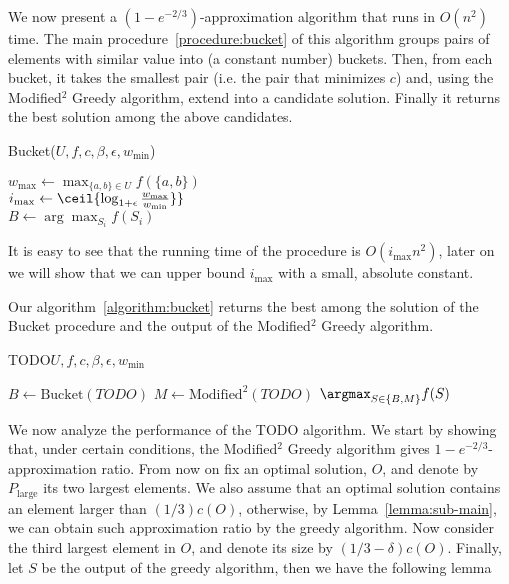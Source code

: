 \def\pLarge{P_{\text{large}}}
\def\pValuable{P_{\text{valuable}}}

We now present a $(1-e^{-2/3})$-approximation algorithm that runs in $O(n^2)$ time.
The main procedure~\ref{procedure:bucket} of this algorithm  groups pairs of elements with similar value into (a constant number) buckets.
Then, from each bucket, it takes the smallest pair (i.e. the pair that minimizes $c$) and, using the Modified$^2$ Greedy algorithm, extend into a candidate solution.
Finally it returns the best solution among the above candidates.

\begin{procedure}
	\caption{Bucket($U, f, c, \beta, \epsilon, w_{\min}$)}
	\label{procedure:bucket}
	$w_{\max} \leftarrow \max_{\{a, b\} \in U}f(\{a, b\})$
	\\
	$i_{\max} \leftarrow \ceil{\log_{1 + \epsilon}\frac{w_{\max}}{w_{\min}}\}}$
	\\
	$B \leftarrow \arg\max_{S_i}f(S_i)$
	\\
\end{procedure}

It is easy to see that the running time of the procedure is $O(i_{\max}n^2)$,
later on we will show that we can upper bound $i_{\max}$ with a small, absolute constant.

Our algorithm~\ref{algorithm:bucket} returns the best among the solution of the Bucket procedure and the output of the Modified$^2$ Greedy algorithm.

\begin{algorithm}
	\caption{
		\label{algorithm:bucket}
		TODO$U, f, c, \beta, \epsilon, w_{\min}$
	}
	$B \leftarrow \text{Bucket}(TODO)$
	$M \leftarrow \text{Modified}^2(TODO)$
	\Return $\argmax_{S \in \{B, M\}}f(S)$
\end{algorithm}

We now analyze the performance of the TODO algorithm.
We start by showing that,  under certain conditions, the Modified$^2$ Greedy algorithm gives $1 - e^{-2/3}$-approximation ratio.
From now on fix an optimal solution, $O$, and denote by $\pLarge$ its two largest elements.
We also assume that an optimal solution contains an element larger than $(1/3)c(O)$, otherwise, by Lemma~\ref{lemma:sub-main}, we can obtain such approximation ratio by the greedy algorithm.
Now consider the third largest element in $O$, and denote its size by $(1/3 - \delta)c(O)$.
Finally, let $S$ be the output of the greedy algorithm, then we have the following lemma

